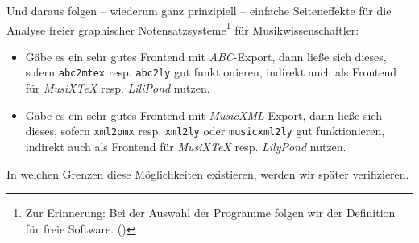 Und daraus folgen -- wiederum ganz prinzipiell -- einfache Seiteneffekte für die
Analyse freier graphischer Notensatzsysteme\footnote{Zur Erinnerung: Bei der
Auswahl der Programme folgen wir der Definition für freie Software. (\cite[Vgl.
dazu][\nopage wp]{FSF2018a})} für Musikwissenschaftler:

\begin{itemize}
  \item Gäbe es ein sehr gutes Frontend mit \textit{ABC}-Export, dann ließe sich
  dieses, sofern \texttt{abc2mtex} resp. \texttt{abc2ly} gut funktionieren,
  indirekt auch als Frontend für \textit{MusiX\TeX} resp. \textit{LiliPond}
  nutzen.
  \item  Gäbe es ein sehr gutes Frontend mit \textit{MusicXML}-Export, dann
  ließe sich dieses, sofern \texttt{xml2pmx} resp. \texttt{xml2ly} oder
  \texttt{musicxml2ly} gut funktionieren, indirekt auch als Frontend für
  \textit{MusiX\TeX} resp. \textit{LilyPond}  nutzen.
\end{itemize}

In welchen Grenzen diese Möglichkeiten existieren, werden wir später verifizieren.

 

%
